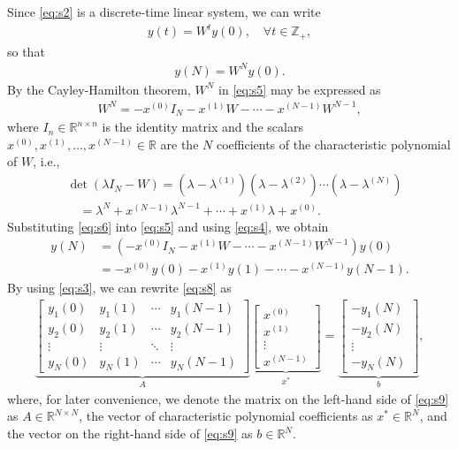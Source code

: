 \documentclass[11pt]{article}
\theoremstyle{plain}
\theoremstyle{definition}
\theoremstyle{remark}
\begin{document}
Since \eqref{eq:s2} is a discrete-time linear system, we can write
\begin{align}
y(t)=W^ty(0),\quad\forall t\in\mathbb{Z}_+,\label{eq:s4}
\end{align}
so that
\begin{align}
y(N)=W^Ny(0).\label{eq:s5}
\end{align}
By the Cayley-Hamilton theorem, $W^N$ in \eqref{eq:s5} may be expressed as
\begin{align}
W^N=-x^{(0)}I_N-x^{(1)}W-\cdots-x^{(N-1)}W^{N-1},\label{eq:s6}
\end{align}
where $I_n\in\mathbb{R}^{n\times n}$ is the identity matrix and the scalars $x^{(0)},x^{(1)},\ldots,x^{(N-1)}\in\mathbb{R}$ are the $N$ coefficients of the characteristic polynomial of $W$, i.e.,
\begin{align}
&\operatorname{det}(\lambda I_N-W)=(\lambda-\lambda^{(1)})(\lambda-\lambda^{(2)})\cdots(\lambda-\lambda^{(N)})\nonumber\\
&\quad=\lambda^N+x^{(N-1)}\lambda^{N-1}+\cdots+x^{(1)}\lambda+x^{(0)}.\label{eq:s7}
\end{align}
Substituting \eqref{eq:s6} into \eqref{eq:s5} and using \eqref{eq:s4}, we obtain
\begin{align}
y(N)&=(-x^{(0)}I_N-x^{(1)}W-\cdots-x^{(N-1)}W^{N-1})y(0)\nonumber\\
&=-x^{(0)}y(0)-x^{(1)}y(1)-\cdots-x^{(N-1)}y(N-1).\label{eq:s8}
\end{align}
By using \eqref{eq:s3}, we can rewrite \eqref{eq:s8} as
\begin{align}
\underbrace{\begin{bmatrix}y_1(0) & y_1(1) & \cdots & y_1(N-1)\\ y_2(0) & y_2(1) & \cdots & y_2(N-1)\\ \vdots & \vdots & \ddots & \vdots\\ y_N(0) & y_N(1) & \cdots & y_N(N-1)\end{bmatrix}}_{A}\underbrace{\begin{bmatrix}x^{(0)}\\ x^{(1)}\\ \vdots\\ x^{(N-1)}\end{bmatrix}}_{x^*}=\underbrace{\begin{bmatrix}-y_1(N)\\ -y_2(N)\\ \vdots\\ -y_N(N)\end{bmatrix}}_{b},\label{eq:s9}
\end{align}
where, for later convenience, we denote the matrix on the left-hand side of \eqref{eq:s9} as $A\in\mathbb{R}^{N\times N}$, the vector of characteristic polynomial coefficients as $x^*\in\mathbb{R}^N$, and the vector on the right-hand side of \eqref{eq:s9} as $b\in\mathbb{R}^N$.
\end{document}
